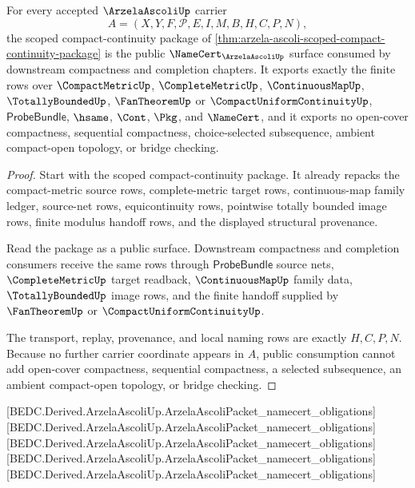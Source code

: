\begin{theorem}
\label{thm:arzela-ascoli-public-certificate}
For every accepted $\ArzelaAscoliUp$ carrier
$$
A=(X,Y,F,\mathcal{P},E,I,M,B,H,C,P,N),
$$
the scoped compact-continuity package of \autoref{thm:arzela-ascoli-scoped-compact-continuity-package} is the public $\NameCert_{\ArzelaAscoliUp}$ surface consumed by downstream compactness and completion chapters. It exports exactly the finite rows over $\CompactMetricUp$, $\CompleteMetricUp$, $\ContinuousMapUp$, $\TotallyBoundedUp$, $\FanTheoremUp$ or $\CompactUniformContinuityUp$, $\mathsf{ProbeBundle}$, $\hsame$, $\Cont$, $\Pkg$, and $\NameCert$, and it exports no open-cover compactness, sequential compactness, choice-selected subsequence, ambient compact-open topology, or bridge checking.
\end{theorem}
\begin{proof}
Start with the scoped compact-continuity package. It already repacks the compact-metric source rows, complete-metric target rows, continuous-map family ledger, source-net rows, equicontinuity rows, pointwise totally bounded image rows, finite modulus handoff rows, and the displayed structural provenance.

Read the package as a public surface. Downstream compactness and completion consumers receive the same rows through $\mathsf{ProbeBundle}$ source nets, $\CompleteMetricUp$ target readback, $\ContinuousMapUp$ family data, $\TotallyBoundedUp$ image rows, and the finite handoff supplied by $\FanTheoremUp$ or $\CompactUniformContinuityUp$.

The transport, replay, provenance, and local naming rows are exactly $H,C,P,N$. Because no further carrier coordinate appears in $A$, public consumption cannot add open-cover compactness, sequential compactness, a selected subsequence, an ambient compact-open topology, or bridge checking.
\end{proof}


[BEDC.Derived.ArzelaAscoliUp.ArzelaAscoliPacket\_namecert\_obligations]
[BEDC.Derived.ArzelaAscoliUp.ArzelaAscoliPacket\_namecert\_obligations]
[BEDC.Derived.ArzelaAscoliUp.ArzelaAscoliPacket\_namecert\_obligations]
[BEDC.Derived.ArzelaAscoliUp.ArzelaAscoliPacket\_namecert\_obligations]
[BEDC.Derived.ArzelaAscoliUp.ArzelaAscoliPacket\_namecert\_obligations]

